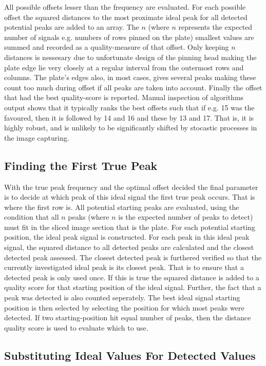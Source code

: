\documentclass{article}
\begin{document}
All possible offsets lesser than the frequency are evaluated. 
For each possible offset the squared distances to the most proximate 
ideal peak for all detected potential peaks are added to an array. 
The $n$ (where $n$ represents the expected number of signals e.g. numbers
of rows pinned on the plate) smallest values are summed and recorded as a 
quality-measure of that offset. 
Only keeping $n$ distances is nessesary due to unfortunate design of the
pinning head making the plate edge lie very closely at a regular interval
from the outermost rows and columns. 
The plate's edges also, in most cases, gives several peaks making these 
count too much during offset if all peaks are taken into account.
Finally the offset that had the best quality-score is reported.
Manual inspection of algorithms output shows that it typically ranks the
best offsets such that if e.g. 15 was the favoured, then it is followed
by 14 and 16 and these by 13 and 17. 
That is, it is highly robust, and is unlikely to be significantly shifted
by stocastic processes in the image capturing.

\subsection{Finding the First True Peak}

With the true peak frequency and the optimal offset decided the final
parameter is to decide at which peak of this ideal signal the first true
peak occurs.
That is where the first row is.
All potential starting peaks are evaluated, using the condition that all
$n$ peaks (where $n$ is the expected number of peaks to detect) must fit
in the sliced image section that is the plate.
For each potential starting position, the ideal peak signal is constructed.
For each peak in this ideal peak signal, the squared distance to all 
detected peaks are calculated and the closest detected peak assessed.
The closest detected peak is furthered verified so that the currently 
investigated ideal peak is its closest peak.
That is to ensure that a detected peak is only used once.
If this is true the squared distance is added to a quality score for
that starting position of the ideal signal. 
Further, the fact that a peak was detected is also counted seperately.
The best ideal signal starting position is then selected by selecting
the position for which most peaks were detected. 
If two starting-position hit equal number of peaks, then the distance
quality score is used to evaluate which to use.

\subsection{Substituting Ideal Values For Detected Values}
\end{document}
